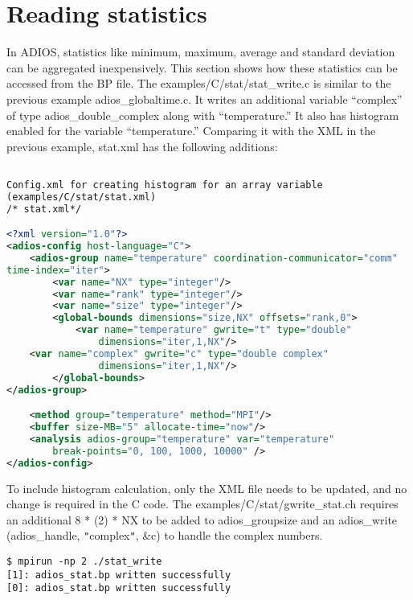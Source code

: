 \section{Reading statistics}

In ADIOS, statistics like minimum, maximum, average and standard deviation can 
be aggregated inexpensively. This section shows how these statistics can be accessed 
from the BP file. The examples/C/stat/stat\_write.c is similar to the previous 
example adios\_globaltime.c. It writes an additional variable ``complex'' of type 
adios\_double\_complex along with ``temperature.''  It also has histogram enabled 
for the variable ``temperature.''  Comparing it with the XML in the previous example, 
stat.xml has the following additions:

\begin{lstlisting}[language=XML,caption=Config.xml for creating histogram for an array variable
(examples/C/stat/stat.xml)]

Config.xml for creating histogram for an array variable
(examples/C/stat/stat.xml)
/* stat.xml*/

<?xml version="1.0"?>
<adios-config host-language="C">
 	<adios-group name="temperature" coordination-communicator="comm" 
time-index="iter">
 		<var name="NX" type="integer"/>
 		<var name="rank" type="integer"/>
 		<var name="size" type="integer"/>
 		<global-bounds dimensions="size,NX" offsets="rank,0">
 			<var name="temperature" gwrite="t" type="double"
 				dimensions="iter,1,NX"/>
 	<var name="complex" gwrite="c" type="double complex"
 				dimensions="iter,1,NX"/>
 		</global-bounds>
</adios-group>

 	<method group="temperature" method="MPI"/>
 	<buffer size-MB="5" allocate-time="now"/>
 	<analysis adios-group="temperature" var="temperature"
 		break-points="0, 100, 1000, 10000" />
</adios-config>
\end{lstlisting}

To include histogram calculation, only the XML file needs to be updated, and no 
change is required in the C code. The examples/C/stat/gwrite\_stat.ch requires 
an additional {\color{color02} 8 * (2) * NX} to be added to adios\_groupsize and 
an adios\_write (adios\_handle, \texttt{"}complex\texttt{"}, \&c) to handle the 
complex numbers.

\begin{lstlisting}
$ mpirun -np 2 ./stat_write
[1]: adios_stat.bp written successfully
[0]: adios_stat.bp written successfully
\end{lstlisting}


